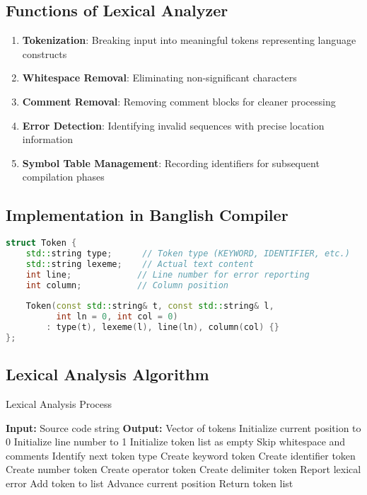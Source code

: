 \documentclass[12pt,a4paper]{article}
\begin{document}
\subsection{Functions of Lexical Analyzer}

\begin{enumerate}[leftmargin=*,itemsep=4pt]
    \item \textbf{Tokenization}: Breaking input into meaningful tokens representing language constructs
    \item \textbf{Whitespace Removal}: Eliminating non-significant characters
    \item \textbf{Comment Removal}: Removing comment blocks for cleaner processing
    \item \textbf{Error Detection}: Identifying invalid sequences with precise location information
    \item \textbf{Symbol Table Management}: Recording identifiers for subsequent compilation phases
\end{enumerate}

\subsection{Implementation in Banglish Compiler}

\begin{lstlisting}[language=C++, caption=Token Structure Implementation]
struct Token {
    std::string type;      // Token type (KEYWORD, IDENTIFIER, etc.)
    std::string lexeme;    // Actual text content
    int line;             // Line number for error reporting
    int column;           // Column position
    
    Token(const std::string& t, const std::string& l, 
          int ln = 0, int col = 0)
        : type(t), lexeme(l), line(ln), column(col) {}
};
\end{lstlisting}

\subsection{Lexical Analysis Algorithm}

\begin{algorithm}[H]
\caption{Lexical Analysis Process}
\begin{algorithmic}[1]
\State \textbf{Input:} Source code string
\State \textbf{Output:} Vector of tokens
\State
\State Initialize current position to 0
\State Initialize line number to 1
\State Initialize token list as empty
\State
{}
    \State Skip whitespace and comments
    \State Identify next token type
        \State Create keyword token
        \State Create identifier token
        \State Create number token
        \State Create operator token
        \State Create delimiter token
    \Else
        \State Report lexical error
    \EndIf
    \State Add token to list
    \State Advance current position
\EndWhile
\State Return token list
\end{algorithmic}
\end{algorithm}
\end{document}
